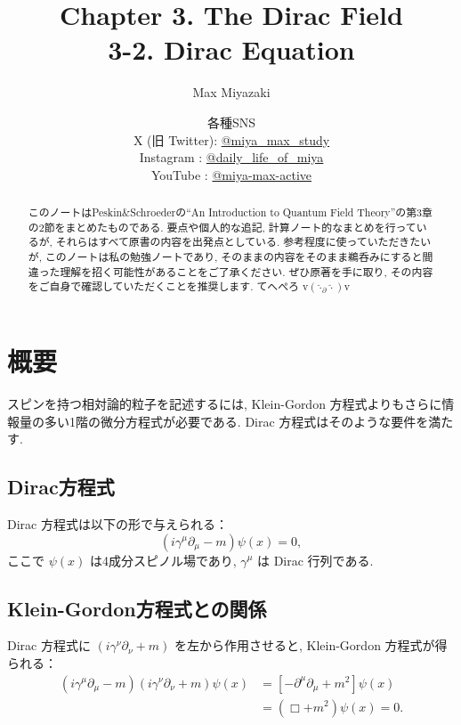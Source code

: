 \documentclass[a4paper,12pt]{article}
\title{Chapter 3. The Dirac Field\\
3-2. Dirac Equation}
\date{各種SNS\\
    X (旧 Twitter): \href{https://x.com/miya_max_study}{@miya\_max\_study}\\
    Instagram : \href{https://www.instagram.com/daily_life_of_miya/}{@daily\_life\_of\_miya}\\
    YouTube : \href{https://www.youtube.com/@miya-max-active}{@miya-max-active}
    }
\author{Max Miyazaki}
\begin{document}
\maketitle

\vspace{1cm}
\begin{abstract}
    このノートはPeskin\&Schroederの``An Introduction to Quantum Field Theory''の第3章の2節をまとめたものである. 要点や個人的な追記, 計算ノート的なまとめを行っているが, それらはすべて原書の内容を出発点としている. 参考程度に使っていただきたいが, このノートは私の勉強ノートであり, そのままの内容をそのまま鵜呑みにすると間違った理解を招く可能性があることをご了承ください. ぜひ原著を手に取り, その内容をご自身で確認していただくことを推奨します. てへぺろ v$({\hat{\cdot}_\partial \hat{\cdot}})$v
\end{abstract}
    
    

\newpage
\color{blue}
\section*{概要}

スピンを持つ相対論的粒子を記述するには, Klein-Gordon 方程式よりもさらに情報量の多い1階の微分方程式が必要である. Dirac 方程式はそのような要件を満たす.

\subsection*{Dirac方程式}

Dirac 方程式は以下の形で与えられる：
\begin{equation*}
(i \gamma^\mu \partial_\mu - m)\psi(x) = 0,
\end{equation*}
ここで $\psi(x)$ は4成分スピノル場であり, $\gamma^\mu$ は Dirac 行列である.

\subsection*{Klein-Gordon方程式との関係}

Dirac 方程式に $(i \gamma^\nu \partial_\nu + m)$ を左から作用させると, Klein-Gordon 方程式が得られる：
\begin{align*}
(i \gamma^\mu \partial_\mu - m)(i \gamma^\nu \partial_\nu + m)\psi(x)
&= \left[ -\partial^\mu \partial_\mu + m^2 \right] \psi(x) \\
&= (\Box + m^2)\psi(x) = 0.
\end{align*}
\end{document}
